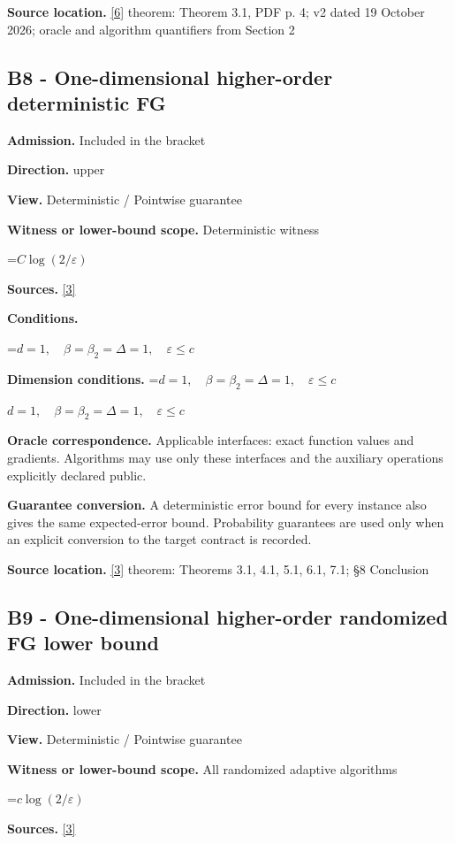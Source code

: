 \documentclass[10pt,a4paper]{article}
\newcommand{\AtlasMath}[1]{\par\begingroup\centering\setbox0=\hbox{$\displaystyle #1$}\ifdim\wd0>1.4\linewidth\typeout{ATLAS WIDE FORMULA: \the\wd0}\fi\ifdim\wd0>\linewidth\resizebox{\linewidth}{!}{\box0}\else\box0\fi\par\endgroup}
\newcommand{\AtlasInlineMath}[1]{\begingroup\setbox0=\hbox{$#1$}\ifdim\wd0>.4\linewidth\endgroup\AtlasMath{#1}\else\endgroup$#1$\fi}
\begin{document}
\textbf{Source location.} \href{https://arxiv.org/pdf/2610.00245v2}{[6]} theorem: Theorem 3.1, PDF p. 4; v2 dated 19 October 2026; oracle and algorithm quantifiers from Section 2

\subsection{B8 - One-dimensional higher-order deterministic FG}
\textbf{Admission.} Included in the bracket

\textbf{Direction.} upper

\textbf{View.} Deterministic / Pointwise guarantee

\textbf{Witness or lower-bound scope.} Deterministic witness

\AtlasMath{C\log(2/\varepsilon)}
\textbf{Sources.} \href{https://arxiv.org/abs/2610.16295}{[3]}

\textbf{Conditions.} 
\AtlasMath{d=1,\quad\beta=\beta_2=\Delta=1,\quad\varepsilon\le c}


\textbf{Dimension conditions.} \AtlasInlineMath{d=1,\quad\beta=\beta_2=\Delta=1,\quad\varepsilon\le c}

\textbf{Oracle correspondence.} Applicable interfaces: exact function values and gradients. Algorithms may use only these interfaces and the auxiliary operations explicitly declared public.

\textbf{Guarantee conversion.} A deterministic error bound for every instance also gives the same expected-error bound. Probability guarantees are used only when an explicit conversion to the target contract is recorded.

\textbf{Source location.} \href{https://arxiv.org/abs/2610.16295}{[3]} theorem: Theorems 3.1, 4.1, 5.1, 6.1, 7.1; §8 Conclusion

\subsection{B9 - One-dimensional higher-order randomized FG lower bound}
\textbf{Admission.} Included in the bracket

\textbf{Direction.} lower

\textbf{View.} Deterministic / Pointwise guarantee

\textbf{Witness or lower-bound scope.} All randomized adaptive algorithms

\AtlasMath{c\log(2/\varepsilon)}
\textbf{Sources.} \href{https://arxiv.org/abs/2610.16295}{[3]}
\end{document}
